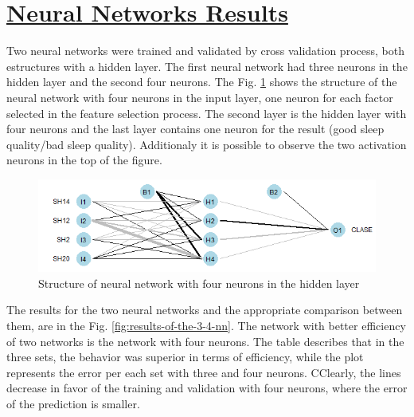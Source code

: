 \documentclass[]{book}
\begin{document}
\section{\texorpdfstring{\protect\hyperlink{NN-results}{Neural Networks
Results}}{Neural Networks Results}}\label{neural-networks-results}

Two neural networks were trained and validated by cross validation
process, both estructures with a hidden layer. The first neural network
had three neurons in the hidden layer and the second four neurons. The
Fig. \ref{fig:nn-four-neurons} shows the structure of the neural network
with four neurons in the input layer, one neuron for each factor
selected in the feature selection process. The second layer is the
hidden layer with four neurons and the last layer contains one neuron
for the result (good sleep quality/bad sleep quality). Additionaly it is
possible to observe the two activation neurons in the top of the figure.

\begin{figure}[H]

{\centering \includegraphics[width=0.8\linewidth]{images/nn-four-neurons} 

}

\caption{Structure of neural network with four neurons in the hidden layer}\label{fig:nn-four-neurons}
\end{figure}

The results for the two neural networks and the appropriate comparison
between them, are in the Fig. \ref{fig:results-of-the-3-4-nn}. The
network with better efficiency of two networks is the network with four
neurons. The table describes that in the three sets, the behavior was
superior in terms of efficiency, while the plot represents the error per
each set with three and four neurons. CClearly, the lines decrease in
favor of the training and validation with four neurons, where the error
of the prediction is smaller.
\end{document}
